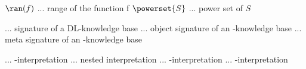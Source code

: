 

$\ran(f)$ ... range of the function f
$\powerset{S}$ ... power set of $S$



\Nsig ... signature of a DL-knowledge base
\Osig ... object signature of an \LMLO-knowledge base
\Msig ... meta signature of an \LMLO-knowledge base

\I ... \Nsig-interpretation
\J ... nested interpretation
\Gmc ... \Osig-interpretation
\Hmc ... \Msig-interpretation


